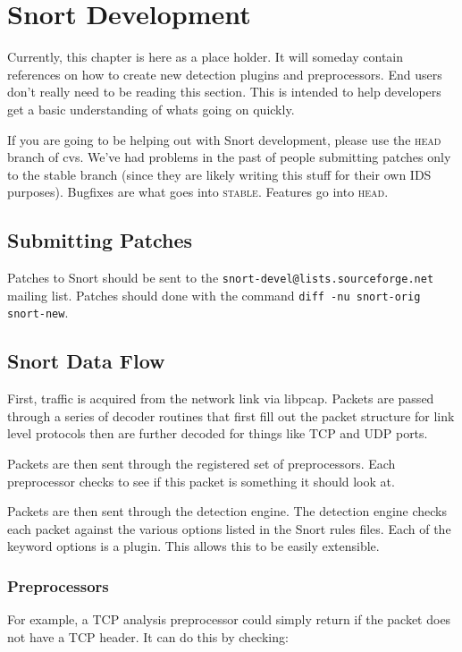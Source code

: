 \documentclass[english]{report}
\begin{document}
\chapter{Snort Development}

Currently, this chapter is here as a place holder. It will someday
contain references on how to create new detection plugins and
preprocessors.  End users don't really need to be reading this
section. This is intended to help developers get a basic understanding
of whats going on quickly.

If you are going to be helping out with Snort development, please
use the \textsc{head} branch of cvs. We've had problems in the past
of people submitting patches only to the stable branch (since they
are likely writing this stuff for their own IDS purposes). Bugfixes
are what goes into \textsc{stable}. Features go into \textsc{head}.

\section{Submitting Patches}
Patches to Snort should be sent to the \verb!snort-devel@lists.sourceforge.net!
mailing list.  Patches should done with the command \verb!diff -nu snort-orig snort-new!.

\section{Snort Data Flow}
First, traffic is acquired from the network link via libpcap. Packets
are passed through a series of decoder routines that first fill out
the packet structure for link level protocols then are further decoded
for things like TCP and UDP ports.

Packets are then sent through the registered set of preprocessors.
Each preprocessor checks to see if this packet is something it should
look at.

Packets are then sent through the detection engine. The detection
engine checks each packet against the various options listed in the
Snort rules files. Each of the keyword options is a plugin. This allows
this to be easily extensible.


\subsection{Preprocessors}

For example, a TCP analysis preprocessor could simply return if the
packet does not have a TCP header. It can do this by checking: 
\end{document}

